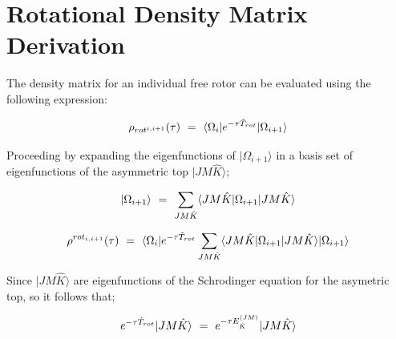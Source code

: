 \documentclass{ece}
\begin{document}
\section{Rotational Density Matrix Derivation}
\label{app:scdappx}

The density matrix for an individual free rotor can be evaluated using the following expression:

\begin{equation}
    \rho_{rot^{i, i+1}} ( \tau ) \hspace{0.125cm} = \hspace{0.125cm} \langle \Omega_{i} | e^{- \tau \hat{T}_{rot}} | \Omega_{i+1} \rangle  
\end{equation}

Proceeding by expanding the eigenfunctions of \begin{math} | \Omega_{i+1} \rangle \end{math} in a basis set of eigenfunctions of the asymmetric top \begin{math} | JM\hat{K} \rangle  \end{math};

\begin{equation}
    | \Omega_{i+1} \rangle \hspace{0.125cm} = \hspace{0.125cm} \sum_{J M \hat{K}} \langle JM\hat{K} | \Omega_{i+1} | JM\hat{K} \rangle  
\end{equation}

\begin{equation}
    \rho^{rot_{i, i+1}} ( \tau ) \hspace{0.125cm} = \hspace{0.125cm} \langle \Omega_{i} | e^{- \tau \hat{T}_{rot}} \sum_{J M \hat{K}} \langle JM\hat{K} | \Omega_{i+1} | JM\hat{K} \rangle | \Omega_{i+1} \rangle 
\end{equation}

Since \begin{math} | JM\hat{K} \rangle  \end{math} are eigenfunctions of the Schrodinger equation for the asymetric top, so it follows that;

\begin{equation}
 e^{- \tau \hat{T}_{rot}}| JM\hat{K} \rangle \hspace{0.125cm} = \hspace{0.125cm}  e^{- \tau E_{\hat{K}}^{(JM)}}| JM\hat{K} \rangle 
\end{equation}
\end{document}
